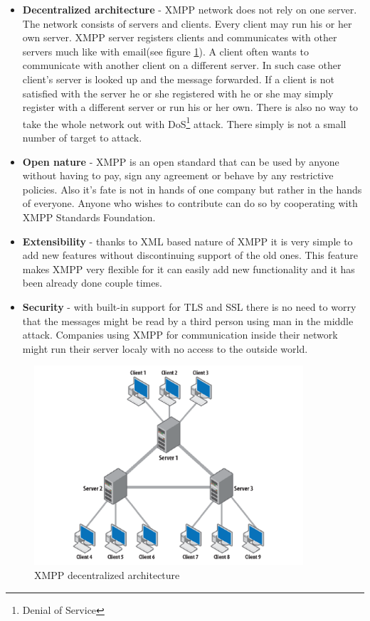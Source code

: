 \begin{itemize}
	\item \textbf{Decentralized architecture} - XMPP network does not rely on one server. The network consists of servers and clients. Every client may run his or her own server. XMPP server registers clients and communicates with other servers much like with email(see figure \ref{fig:xmpp-decentralized-architecture}). A client often wants to communicate with another client on a different server. In such case other client's server is looked up and the message forwarded. If a client is not satisfied with the server he or she registered with he or she may simply register with a different server or run his or her own. There is also no way to take the whole network out with DoS\footnote{Denial of Service} attack. There simply is not a small number of target to attack.    
	\item  \textbf{Open nature} - XMPP is an open standard that can be used by anyone without having to pay, sign any agreement or behave by any restrictive policies. Also it's fate is not in hands of one company but rather in the hands of everyone. Anyone who wishes to contribute can do so by cooperating with XMPP Standards Foundation. 
	\item \textbf{Extensibility} - thanks to XML based nature of XMPP it is very simple to add new features without discontinuing support of the old ones. This feature makes XMPP very flexible for it can easily add new functionality and it has been already done couple times.  
	\item \textbf{Security} - with built-in support for TLS and SSL there is no need to worry that the messages might be read by a third person using man in the middle attack. Companies using XMPP for communication inside their network might run their server localy with no access to the outside world.  
\end{itemize}

\begin{figure}[ht]
\begin{center}
	\includegraphics[width=10cm]{fig/XMPP-decentralized-architecture.png}
	\caption{XMPP decentralized architecture\cite{xmppBook}}
	\label{fig:xmpp-decentralized-architecture}
\end{center}
\end{figure}

